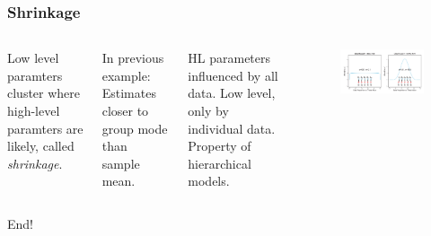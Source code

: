 \documentclass[usenames,dvipsnames,table]{beamer}
\begin{document}
\begin{frame}
\frametitle{Shrinkage}
\begin{columns}[c]
Low level paramters cluster where high-level paramters are likely, called \emph{shrinkage}.

\vspace{1em}
In previous example: Estimates closer to group mode than sample mean.

\vspace{1em}
HL parameters influenced by all data. Low level, only by individual data. Property of hierarchical models.

\begin{figure}
\centering
\includegraphics[width=\linewidth]{img/fig9_12}
\end{figure}
\end{columns}
\end{frame}

\begin{frame}
\begin{center}
{\huge{End!}}
\\\vspace{2em}
\end{center}
\end{frame}
\end{document}
